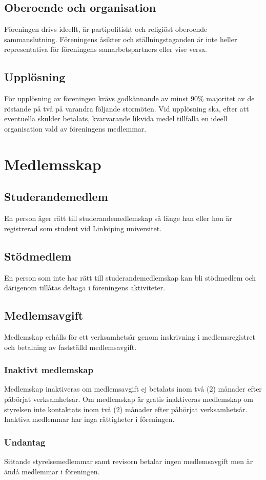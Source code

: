 \documentclass[11pt,a4paper]{article}
\begin{document}
\subsection{Oberoende och organisation}
Föreningen drivs ideellt, är partipolitiskt och religiöst oberoende sammanslutning. Föreningens åsikter och ställningstaganden är inte heller representativa för föreningens samarbetspartners eller vise versa.
\subsection{Upplösning}
För upplösning av föreningen krävs godkännande av minst 90\% majoritet av de röstande på två på varandra följande stormöten. Vid upplösning ska, efter att eventuella skulder betalats, kvarvarande likvida medel tillfalla en ideell organisation vald av föreningens medlemmar.

\section{Medlemsskap}\label{sec:member}
\subsection{Studerandemedlem}
En person äger rätt till studerandemedlemskap så länge han eller hon är registrerad som student vid Linköping universitet.
\subsection{Stödmedlem}
En person som inte har rätt till studerandemedlemskap kan bli stödmedlem och därigenom tillåtas deltaga i föreningens aktiviteter.

\subsection{Medlemsavgift}
Medlemskap erhålls för ett verksamhetsår genom inskrivning i medlemsregistret och betalning av fastställd medlemsavgift.
\subsubsection{Inaktivt medlemskap}
Medlemskap inaktiveras om medlemsavgift ej betalats inom två (2) månader
efter påbörjat verksamhetsår. Om medlemskap är gratis inaktiveras medlemskap om styrelsen inte kontaktats inom två (2) månader efter påbörjat verksamhetsår. Inaktiva medlemmar har inga rättigheter i föreningen.
\subsubsection{Undantag}
Sittande styrelsemedlemmar samt revisorn betalar ingen medlemsavgift men är ändå medlemmar i föreningen.
\end{document}
